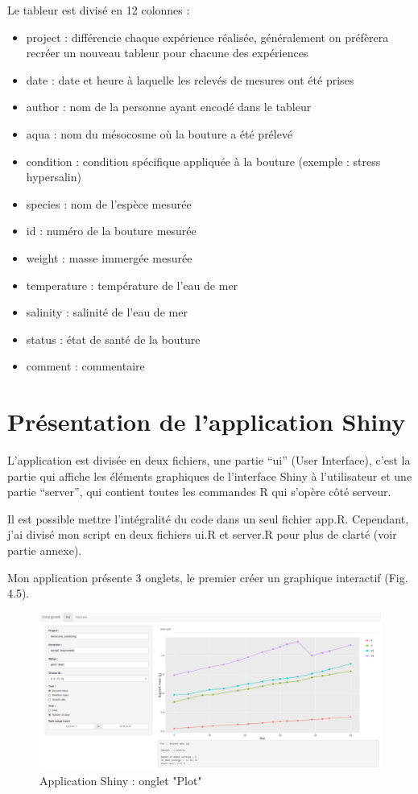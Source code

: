 \documentclass[]{report}
\providecommand{\tightlist}{%
  \setlength{\itemsep}{0pt}\setlength{\parskip}{0pt}}
\begin{document}
Le tableur est divisé en 12 colonnes :

\begin{itemize}
\tightlist
\item
  project : différencie chaque expérience réalisée, généralement on
  préfèrera recréer un nouveau tableur pour chacune des expériences
\item
  date : date et heure à laquelle les relevés de mesures ont été prises
\item
  author : nom de la personne ayant encodé dans le tableur
\item
  aqua : nom du mésocosme où la bouture a été prélevé
\item
  condition : condition spécifique appliquée à la bouture (exemple :
  stress hypersalin)
\item
  species : nom de l'espèce mesurée
\item
  id : numéro de la bouture mesurée
\item
  weight : masse immergée mesurée
\item
  temperature : température de l'eau de mer
\item
  salinity : salinité de l'eau de mer
\item
  status : état de santé de la bouture
\item
  comment : commentaire
\end{itemize}

\section{Présentation de l'application
Shiny}\label{presentation-de-lapplication-shiny}

L'application est divisée en deux fichiers, une partie ``ui'' (User
Interface), c'est la partie qui affiche les éléments graphiques de
l'interface Shiny à l'utilisateur et une partie ``server'', qui contient
toutes les commandes R qui s'opère côté serveur.

Il est possible mettre l'intégralité du code dans un seul fichier app.R.
Cependant, j'ai divisé mon script en deux fichiers ui.R et server.R pour
plus de clarté (voir partie annexe).

\vspace{1 cm}

Mon application présente 3 onglets, le premier créer un graphique
interactif (Fig. 4.5).

\begin{figure}[h!]
\includegraphics[]{../image/notebook-plot1.PNG}
\caption{Application Shiny : onglet "Plot"}
\end{figure}
\end{document}
